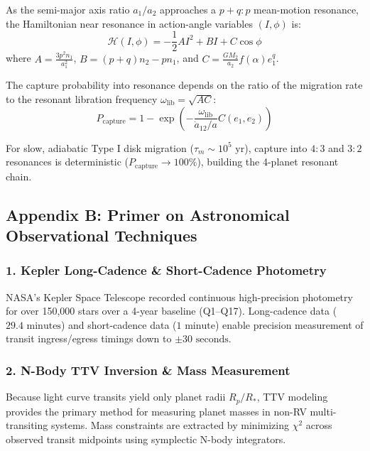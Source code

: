 \documentclass[11pt,a4paper]{article}
\begin{document}
As the semi-major axis ratio $a_1 / a_2$ approaches a $p+q:p$ mean-motion resonance, the Hamiltonian near resonance in action-angle variables $(I, \phi)$ is:
\begin{equation}
\mathcal{H}(I, \phi) = -\frac{1}{2} A I^2 + B I + C \cos \phi
\end{equation}
where $A = \frac{3 p^2 n_1}{a_1^2}$, $B = (p+q) n_2 - p n_1$, and $C = \frac{G M_2}{a_2} f(\alpha) e_1^q$.

The capture probability into resonance depends on the ratio of the migration rate to the resonant libration frequency $\omega_{\text{lib}} = \sqrt{A C}$:
\begin{equation}
P_{\text{capture}} = 1 - \exp\left(-\frac{\omega_{\text{lib}}}{\dot{a}_{12} / a} C(e_1, e_2)\right)
\end{equation}

For slow, adiabatic Type I disk migration ($\tau_m \sim 10^5\text{ yr}$), capture into $4:3$ and $3:2$ resonances is deterministic ($P_{\text{capture}} \to 100\%$), building the 4-planet resonant chain.

\subsection*{Appendix B: Primer on Astronomical Observational Techniques}

\subsubsection*{1. Kepler Long-Cadence \& Short-Cadence Photometry}
NASA's Kepler Space Telescope recorded continuous high-precision photometry for over 150,000 stars over a 4-year baseline (Q1--Q17). Long-cadence data ($29.4\text{ minutes}$) and short-cadence data ($1\text{ minute}$) enable precision measurement of transit ingress/egress timings down to $\pm 30\text{ seconds}$.

\subsubsection*{2. N-Body TTV Inversion \& Mass Measurement}
Because light curve transits yield only planet radii $R_p / R_*$, TTV modeling provides the primary method for measuring planet masses in non-RV multi-transiting systems. Mass constraints are extracted by minimizing $\chi^2$ across observed transit midpoints using symplectic N-body integrators.
\end{document}
